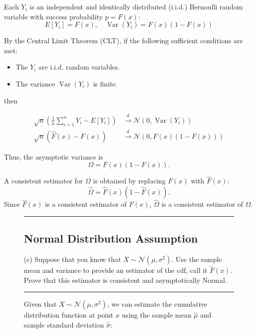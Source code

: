 \documentclass{article}
\newenvironment{colorparagraph}[1]{\par\color{#1}}{\par}
\begin{document}
Each \( Y_i \) is an independent and identically distributed (i.i.d.) Bernoulli random variable with success probability \( p = F(x) \):
\[
E[Y_i] = F(x), \quad \operatorname{Var}(Y_i) = F(x)(1 - F(x))
\]

By the Central Limit Theorem (CLT), if the following sufficient conditions are met:
\begin{itemize}
    \item The \( Y_i \) are i.i.d. random variables.
    \item The variance \( \operatorname{Var}(Y_i) \) is finite.
\end{itemize}
then

$$
\begin{aligned}
  \sqrt{n}\left( \frac{1}{n} \sum_{i=1}^n Y_i - E[Y_i] \right) &\xrightarrow{d} \mathcal{N}(0, \operatorname{Var}(Y_i)) \\
  \sqrt{n}(\hat{F}(x) - F(x)) &\xrightarrow{d} \mathcal{N}\left( 0, F(x)(1 - F(x)) \right)
\end{aligned}
$$

Thus, the asymptotic variance is
\[
\Omega = F(x)(1 - F(x)).
\]

A consistent estimator for \( \Omega \) is obtained by replacing \( F(x) \) with \( \hat{F}(x) \):
\[
\hat{\Omega} = \hat{F}(x)\left( 1 - \hat{F}(x) \right).
\]
Since \( \hat{F}(x) \) is a consistent estimator of \( F(x) \), \( \hat{\Omega} \) is a consistent estimator of \( \Omega \).

\begin{figure}[H]
\begin{colorparagraph}{questioncolor}
\label{q2c}
\rule{\textwidth}{0.5pt}
\subsection{Normal Distribution Assumption}
(c) Suppose that you know that \( X \sim \mathcal{N}(\mu, \sigma^2) \). Use the sample mean and variance to provide an estimator of the cdf, call it \( \tilde{F}(x) \). Prove that this estimator is consistent and asymptotically Normal.

\rule{\textwidth}{0.5pt}
\end{colorparagraph}

Given that \( X \sim \mathcal{N}(\mu, \sigma^2) \), we can estimate the cumulative distribution function at point \( x \) using the sample mean \( \hat{\mu} \) and sample standard deviation \( \hat{\sigma} \):
\end{figure}
\end{document}
